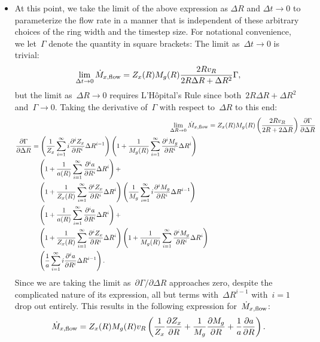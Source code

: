 \documentclass[main.tex]{subfiles}
\begin{document}
\begin{itemize}
	\item At this point, we take the limit of the above expression as
	$\Delta R$ and $\Delta t \rightarrow 0$ to parameterize the flow rate in a
	manner that is independent of these arbitrary choices of the ring width and
	the timestep size.
	For notational convenience, we let~$\Gamma$ denote the quantity in square
	brackets:
	The limit as~$\Delta t \rightarrow 0$ is trivial:
	\begin{equation}
	\lim_{\Delta t \rightarrow 0} \dot{M}_{x,\text{flow}} = Z_x(R) M_g(R)
	\frac{2 R v_R}{2 R \Delta R + \Delta R^2} \Gamma,
	\end{equation}
	but the limit as~$\Delta R \rightarrow 0$ requires L'H\^opital's Rule since
	both~$2 R \Delta R + \Delta R^2$ and~$\Gamma \rightarrow 0$.
	Taking the derivative of~$\Gamma$ with respect to~$\Delta R$ to this end:
	\begin{subequations}\begin{align}
	\lim_{\Delta R \rightarrow 0} \dot{M}_{x,\text{flow}} &=
	Z_x(R) M_g(R) \left( \frac{2 R v_R}{2R + 2 \Delta R} \right)
	\frac{\partial \Gamma}{\partial \Delta R}
	\\
	\begin{split}
	\frac{\partial \Gamma}{\partial \Delta R} &=
	\left(\frac{1}{Z_x} \sum_{i = 1}^\infty i
	\frac{\partial^i Z_x}{\partial R^i} \Delta R^{i - 1}\right)
	\left(1 + \frac{1}{M_g(R)}
	\sum_{i = 1}^\infty \frac{\partial^i M_g}{\partial R^i} \Delta R^i\right)
	\\
	&\quad
	\left(1 + \frac{1}{a(R)}
	\sum_{i = 1}^\infty \frac{\partial^i a}{\partial R^i} \Delta R^i\right) +
	\\
	&\quad
	\left(1 + \frac{1}{Z_x(R)}
	\sum_{i = 1}^\infty \frac{\partial^i Z_x}{\partial R^i} \Delta R^i\right)
	\left(\frac{1}{M_g} \sum_{i = 1}^\infty i
	\frac{\partial^i M_g}{\partial R^i} \Delta R^{i - 1}\right)
	\\
	&\quad
	\left(1 + \frac{1}{a(R)}
	\sum_{i = 1}^\infty \frac{\partial^i a}{\partial R^i} \Delta R^i\right) +
	\\
	&\quad
	\left(1 + \frac{1}{Z_x(R)}
	\sum_{i = 1}^\infty \frac{\partial^i Z_x}{\partial R^i} \Delta R^i\right)
	\left(1 + \frac{1}{M_g(R)}
	\sum_{i = 1}^\infty \frac{\partial^i M_g}{\partial R^i} \Delta R^i\right)
	\\
	&\quad
	\left(\frac{1}{a} \sum_{i = 1}^\infty i \frac{\partial^i a}{\partial R^i}
	\Delta R^{i - 1}\right).
	\end{split}
	\end{align}\end{subequations}
	Since we are taking the limit as~$\partial \Gamma / \partial \Delta R$
	approaches zero, despite the complicated nature of its expression, all but
	terms with~$\Delta R^{i - 1}$ with~$i = 1$ drop out entirely.
	This results in the following expression for~$\dot{M}_{x,\text{flow}}$:
	\begin{equation}
	\dot{M}_{x,\text{flow}} = Z_x(R) M_g(R) v_R \left(
	\frac{1}{Z_x} \frac{\partial Z_x}{\partial R} +
	\frac{1}{M_g} \frac{\partial M_g}{\partial R} +
	\frac{1}{a} \frac{\partial a}{\partial R}
	\right).
	\end{equation}

\end{itemize}
\end{document}

